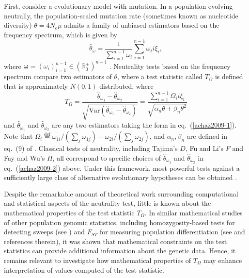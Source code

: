 \documentclass[lettersize, 10.5pt]{article}
\begin{document}
First, consider a evolutionary model with mutation. In a population evolving neutrally, the population-scaled mutation rate (sometimes known as nucleotide diversity) $\theta=4N_e\mu$ admits a family of unbiased estimators based on the frequency spectrum, which is given by
\begin{equation}
\hat{\theta}_\omega = \frac{1}{\sum_{i=1}^{n-1}\omega_i} \sum_{i=1}^{n-1}\omega_i i\xi_i, \label{achaz2009-1}
\end{equation}
where $\boldsymbol{\omega}=(\omega_i)_{i=1}^{n-1}\in (\mathbb{R}_0^+)^{n-1}$ \cite{Achaz2009}. Neutrality tests based on the frequency spectrum compare two estimators of $\theta$, where a test statistic called $T_\Omega$ is defined that is approximately $N(0,1)$ distributed, where 
\begin{equation}
T_\Omega=\frac{\hat{\theta}_{\omega_1}-\hat{\theta}_{\omega_2}}{\sqrt{\text{Var}\left(\hat{\theta}_{\omega_1}-\hat{\theta}_{\omega_2}\right)}} = \frac{\sum_{i=1}^{n-1}\Omega_i i\xi_i}{\sqrt{\alpha_n\theta+\beta_n\theta^2}} \label{achaz2009-2}
\end{equation}
and $\hat{\theta}_{\omega_1}$ and $\hat{\theta}_{\omega_2}$ are any two estimators taking the form in eq.~(\ref{achaz2009-1}). Note that $\Omega_i\overset{\text{def}}{=}\omega_{1i}\big/\left(\sum_j \omega_{1j}\right) - \omega_{2i}\big/\left(\sum_j \omega_{2j}\right)$, and $\alpha_n,\beta_n$ are defined in eq.~(9) of \cite{Achaz2009}. Classical tests of neutrality, including Tajima's $D$, Fu and Li's $F$ and Fay and Wu's $H$, all correspond to specific choices of $\hat{\theta}_{\omega_1}$ and $\hat{\theta}_{\omega_2}$ in eq.~(\ref{achaz2009-2}) above. Under this framework, most powerful tests against a sufficiently large class of alternative evolutionary hypotheses can be obtained \cite{Ferretti2010}. 

Despite the remarkable amount of theoretical work surrounding computational and statistical aspects of the neutrality test, little is known about the mathematical properties of the test statistic $T_\Omega$. In similar mathematical studies of other population genomic statistics, including homozygosity-based tests for detecting sweeps (see \cite{Garud2015}) and $F_{ST}$ for measuring population differentiation (see \cite{Alcala2017} and references therein), it was shown that mathematical constraints on the test statistics can provide additional information about the genetic data. Hence, it remains relevant to investigate how mathematical properties of $T_\Omega$ may enhance interpretation of values computed of the test statistic.
\end{document}
